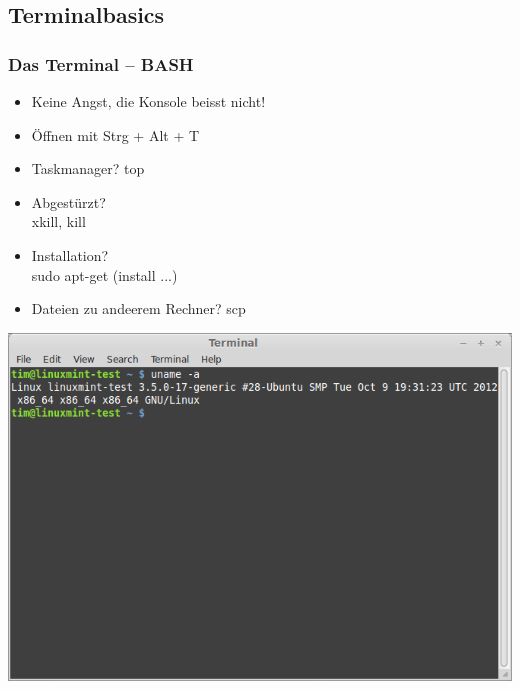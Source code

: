 \documentclass{beamer}
\begin{document}
	    \subsection{Terminalbasics}
    	    \begin{frame}
          		\frametitle{Das Terminal -- BASH}
          		\begin{center}
              		\begin{minipage}{0.60\textwidth}
            		    \begin{itemize}
            		        \item Keine Angst, die Konsole beisst nicht!
            		        \item Öffnen mit Strg + Alt + T
            		    \end{itemize}
            		\end{minipage}%
          		\end{center}
        		\begin{minipage}{0.50\textwidth}
        		    \begin{itemize}
        		        \item Taskmanager? 
        		        top
        		        \item Abgestürzt? \\
        		        xkill, kill
        		        \item Installation? \\
        		        sudo apt-get (install ...)
        		        \item Dateien zu andeerem Rechner?
        		        scp
        		    \end{itemize}
        		\end{minipage}%
        		\begin{minipage}{0.54\textwidth}
        		    \includegraphics[scale=0.25]{bilder/terminal.png}
        		\end{minipage}
        	\end{frame}
\end{document}
